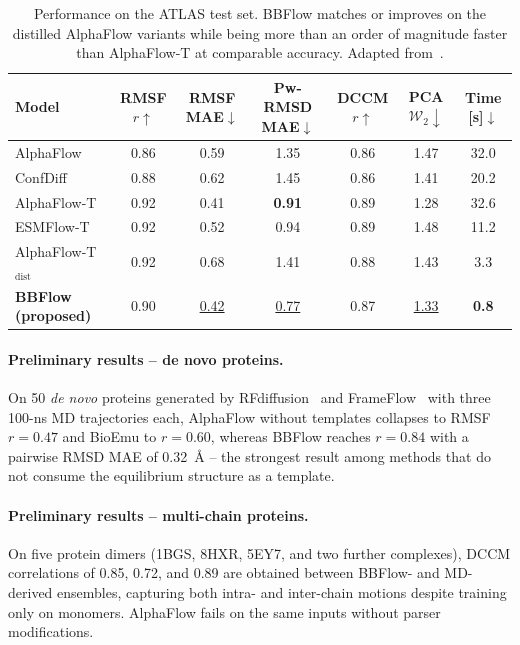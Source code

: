 \documentclass[12pt]{article}
\begin{document}
\begin{table}[h]
\centering
\small
\begin{tabular}{lcccccc}
\toprule
Model & RMSF $r\uparrow$ & RMSF MAE$\downarrow$ & Pw-RMSD MAE$\downarrow$ & DCCM $r\uparrow$ & PCA $\mathcal{W}_2\downarrow$ & Time [s]$\downarrow$\\
\midrule
AlphaFlow         & 0.86 & 0.59 & 1.35 & 0.86 & 1.47 & 32.0 \\
ConfDiff          & 0.88 & 0.62 & 1.45 & 0.86 & 1.41 & 20.2 \\
AlphaFlow-T       & 0.92 & 0.41 & \textbf{0.91} & 0.89 & 1.28 & 32.6 \\
ESMFlow-T         & 0.92 & 0.52 & 0.94 & 0.89 & 1.48 & 11.2 \\
AlphaFlow-T$_{\mathrm{dist}}$ & 0.92 & 0.68 & 1.41 & 0.88 & 1.43 & 3.3 \\
\textbf{BBFlow (proposed)} & 0.90 & \underline{0.42} & \underline{0.77} & 0.87 & \underline{1.33} & \textbf{0.8} \\
\bottomrule
\end{tabular}
\caption{Performance on the ATLAS test set. BBFlow matches or improves on the
distilled AlphaFlow variants while being more than an order of magnitude
faster than AlphaFlow-T at comparable accuracy. Adapted from~\cite{wolf2025bbflow}.}
\label{tab:atlas}
\end{table}

\paragraph{Preliminary results -- de novo proteins.}
On 50 \emph{de novo} proteins generated by RFdiffusion~\cite{watson2023rfdiffusion}
and FrameFlow~\cite{yim2024framefw} with three 100-ns MD trajectories each,
AlphaFlow without templates collapses to RMSF $r=0.47$ and BioEmu to $r=0.60$,
whereas BBFlow reaches $r=0.84$ with a pairwise RMSD MAE of 0.32~\AA{} -- the
strongest result among methods that do not consume the equilibrium structure
as a template.

\paragraph{Preliminary results -- multi-chain proteins.}
On five protein dimers (1BGS, 8HXR, 5EY7, and two further complexes), DCCM
correlations of 0.85, 0.72, and 0.89 are obtained between BBFlow- and
MD-derived ensembles, capturing both intra- and inter-chain motions despite
training only on monomers. AlphaFlow fails on the same inputs without parser
modifications.
\end{document}
